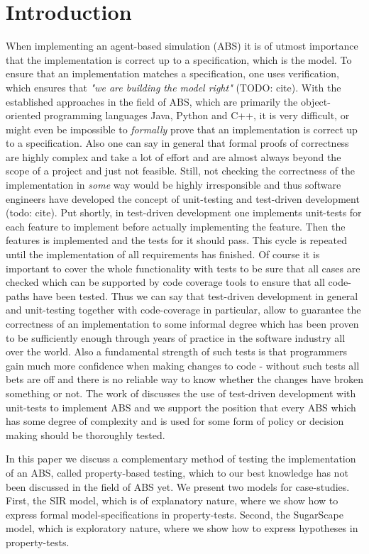 \section{Introduction}
When implementing an agent-based simulation (ABS) it is of utmost importance that the implementation is correct up to a specification, which is the model. To ensure that an implementation matches a specification, one uses verification, which ensures that \textit{"we are building the model right"} (TODO: cite). With the established approaches in the field of ABS, which are primarily the object-oriented programming languages Java, Python and C++, it is very difficult, or might even be impossible to \textit{formally} prove that an implementation is correct up to a specification. Also one can say in general that formal proofs of correctness are highly complex and take a lot of effort and are almost always beyond the scope of a project and just not feasible. Still, not checking the correctness of the implementation in \textit{some} way would be highly irresponsible and thus software engineers have developed the concept of unit-testing and test-driven development (todo: cite). Put shortly, in test-driven development one implements unit-tests for each feature to implement before actually implementing the feature. Then the features is implemented and the tests for it should pass. This cycle is repeated until the implementation of all requirements has finished. Of course it is important to cover the whole functionality with tests to be sure that all cases are checked which can be supported by code coverage tools to ensure that all code-paths have been tested.
Thus we can say that test-driven development in general and unit-testing together with code-coverage in particular, allow to guarantee the correctness of an implementation to some informal degree which has been proven to be sufficiently enough through years of practice in the software industry all over the world. Also a fundamental strength of such tests is that programmers gain much more confidence when making changes to code - without such tests all bets are off and there is no reliable way to know whether the changes have broken something or not.
The work of \cite{collier_test-driven_2013} discusses the use of test-driven development with unit-tests to implement ABS and we support the position that every ABS which has some degree of complexity and is used for some form of policy or decision making should be thoroughly tested.

In this paper we discuss a complementary method of testing the implementation of an ABS, called property-based testing, which to our best knowledge has not been discussed in the field of ABS yet. We present two models for case-studies. First, the SIR model, which is of explanatory nature, where we show how to express formal model-specifications in property-tests. Second, the SugarScape model, which is exploratory nature, where we  show how to express hypotheses in property-tests.

